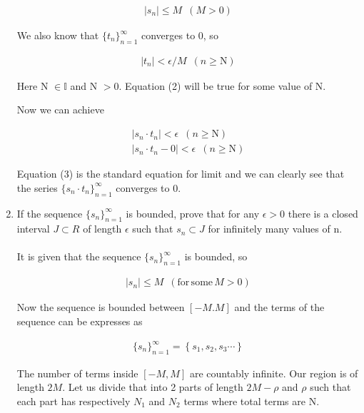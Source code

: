\documentclass[11pt, letterpaper]{article}
\begin{document}
\begin{enumerate}
{	\setcounter{equation}{0}
	
	\begin{eqnarray}
		\left| s_n \right| \leq M \,\,\, ( M > 0)
	\end{eqnarray}
	
	We also know that $ \lbrace t_n \rbrace_{n=1}^\infty $ converges to 0, so
	
	\begin{eqnarray}
		\left| t_n \right| < \epsilon / M \,\,\, (n \geq \mathrm{N})
	\end{eqnarray}
	
	Here N $\in \mathbb{I}$ and N $> 0$. Equation (2) will be true for some value of N.
	
	Now we can achieve 
	
	\begin{eqnarray}
		\left| s_n \cdot t_n \right| < \epsilon \,\,\, (n \geq \mathrm{N})\nonumber \\
		\left| s_n \cdot t_n - 0 \right| < \epsilon \,\,\, (n \geq \mathrm{N})
	\end{eqnarray}
	
	Equation (3) is the standard equation for limit and we can clearly see that the series $ \lbrace s_n \cdot t_n \rbrace_{n=1}^\infty $ converges to 0. 
}

\clearpage

\item{If the sequence $\lbrace s_n \rbrace_{n=1}^\infty$ is bounded, prove that for any $\epsilon > 0$ there is a closed interval $J \subset R$ of length $\epsilon$ such that $s_n \subset J$ for infinitely many values of n.\\\\
	It is given that the sequence $ \lbrace s_n \rbrace_{n=1}^\infty $ is bounded, so
	
	\setcounter{equation}{0}
	
	\begin{eqnarray}
		\left| s_n \right| \leq M \,\,\, (\mathrm{for \, some \,} M >0)
	\end{eqnarray}
	
	Now the sequence is bounded between $[-M. M]$ and the terms of the sequence can be expresses as 
	
	\begin{eqnarray}
		\lbrace s_n \rbrace_{n=1}^\infty = \left\lbrace s_1, s_2, s_3 \cdots \right\rbrace
	\end{eqnarray}
	
	The number of terms inside $[-M, M]$ are countably infinite. Our region is of length $2M$. Let us divide that into 2 parts of length $2M - \rho$ and $\rho$ such that each part has respectively $N_1$ and $N_2$ terms where total terms are N.
	
}
\end{enumerate}
\end{document}
